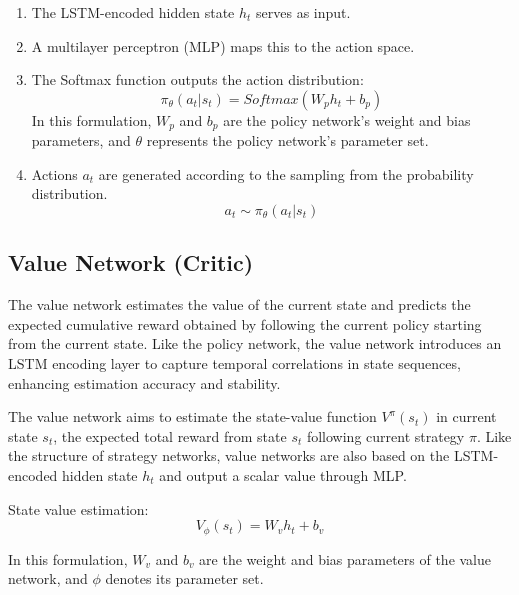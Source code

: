 \begin{enumerate} [label=\arabic*)] 

\item The LSTM-encoded hidden state $h_{t}$ serves as input.

\item A multilayer perceptron (MLP) maps this to the action space.

\item The Softmax function outputs the action distribution:
\begin{equation}
\pi_{\theta}(a_t | s_t) = Softmax(W_p h_t + b_p)
\tag{4.8}
\end{equation}
In this formulation, $W_p$ and $b_p$ are the policy network's weight and bias parameters, and $\theta$ represents the policy network's parameter set.

\item Actions $a_t$ are generated according to the sampling from the probability distribution.
\begin{equation}
a_t \sim \pi_\theta(a_t | s_t)
\end{equation}

\end{enumerate}

\subsection{Value Network (Critic)}

The value network estimates the value of the current state and predicts the expected cumulative reward obtained by following the current policy starting from the current state. Like the policy network, the value network introduces an LSTM encoding layer to capture temporal correlations in state sequences, enhancing estimation accuracy and stability.

The value network aims to estimate the state-value function $V^{\pi}(s_{t})$ in current state $s_{t}$, the expected total reward from state $s_t$ following current strategy $\pi$. Like the structure of strategy networks, value networks are also based on the LSTM-encoded hidden state $h_{t}$ and output a scalar value through MLP.

State value estimation:
\begin{equation}
V_{\phi}(s_t) = W_v h_t + b_v
\end{equation}

In this formulation, $W_v$ and $b_v$ are the weight and bias parameters of the value network, and $\phi$ denotes its parameter set.

